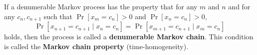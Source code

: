 If a denumerable Markov process has the property that for any $m$ and $n$ and for any $c_n, c_{n+1}$ such that $\Pr[x_m = c_n] > 0$ and $\Pr[x_n = c_n] > 0$,
$$\Pr[x_{n+1} = c_{n+1} \mid x_n = c_n] = \Pr[x_{m+1} = c_{n+1} \mid x_m = c_n]$$
holds, then the process is called a \textbf{denumerable Markov chain}. This condition is called the \textbf{Markov chain property} (time-homogeneity).